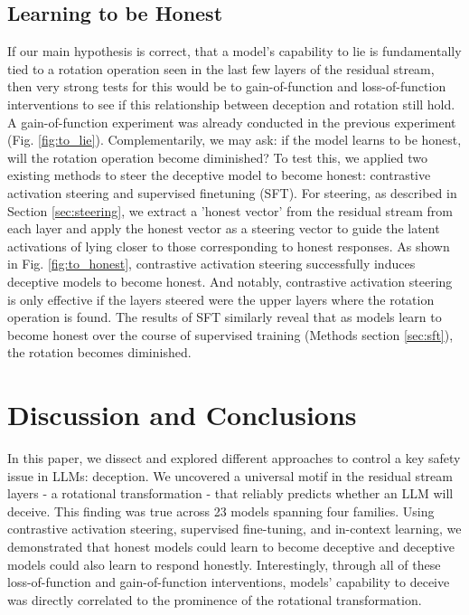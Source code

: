 \documentclass[]{paper}
\begin{document}
\subsection{Learning to be Honest} 

If our main hypothesis is correct, that a model's capability to lie is fundamentally tied to a rotation operation seen in the last few layers of the residual stream, then very strong tests for this would be to gain-of-function and loss-of-function interventions to see if this relationship between deception and rotation still hold. A gain-of-function experiment was already conducted in the previous experiment (Fig. \ref{fig:to_lie}). Complementarily, we may ask: if the model learns to be honest, will the rotation operation become diminished? To test this, we applied two existing methods to steer the deceptive model to become honest: contrastive activation steering and supervised finetuning (SFT). For steering, as described in Section \ref{sec:steering},  we extract a 'honest vector' from the residual stream from each layer and apply the honest vector as a steering vector to guide the latent activations of lying closer to those corresponding  to honest responses.  As shown in Fig. \ref{fig:to_honest}, contrastive activation steering successfully induces deceptive models to become honest. And notably, contrastive activation steering is only effective if the layers steered were the upper layers where the rotation operation is found. The results of SFT similarly reveal that as models learn to become honest over the course of supervised training (Methods section \ref{sec:sft}), the rotation becomes diminished.








\section{Discussion and Conclusions}

In this paper, we dissect and explored different approaches to control a key safety issue in LLMs: deception. We uncovered a universal motif in the residual stream layers - a rotational transformation - that reliably predicts whether an LLM will deceive. This finding was true across 23 models spanning four families. Using contrastive activation steering, supervised fine-tuning, and in-context learning, we demonstrated that honest models could learn to become deceptive and deceptive models could also learn to respond honestly. Interestingly, through all of these loss-of-function and gain-of-function interventions, models’ capability to deceive was directly correlated to the prominence of the rotational transformation. 
\end{document}
